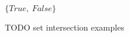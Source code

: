 \begin{frame}
\begin{center}
\Huge $\{True,\ False\}$
\end{center}
\end{frame}


\begin{frame}
TODO set intersection examples
\end{frame}

